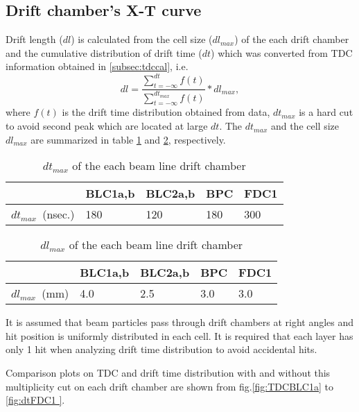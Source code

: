 \subsection{Drift chamber's X-T curve}
\label{subsec:xtcurve}
Drift length ($dl$) is calculated from the cell size ($dl_{max}$) of the each drift chamber and the cumulative distribution of drift time ($dt$) which was converted from TDC information obtained in \ref{subsec:tdccal}, i.e.
\begin{equation}
dl = \frac{\displaystyle \sum_{t=-\infty}^{dt} f(t) }{\displaystyle \sum_{t=-\infty}^{dt_{max}} f(t) }*dl_{max},
\end{equation}
where $f(t)$ is the drift time distribution obtained from data, $dt_{max}$ is a hard cut to avoid second peak which are located at large $dt$.
The $dt_{max}$ and the cell size $dl_{max}$ are summarized in table \ref{tab:dtmax} and \ref{tab:dlmax}, respectively.

\begin{table}[h]
\centering
\begin{tabular}{l|l|l|l|l}\hline
           & BLC1a,b & BLC2a,b & BPC & FDC1 \\\hline
$dt_{max}$\  (nsec.) & 180     & 120     & 180 & 300  \\\hline
\end{tabular}
\caption{\label{tab:dtmax} $dt_{max}$ of the each beam line drift chamber}
\end{table}

\begin{table}[h]
\centering
\begin{tabular}{l|l|l|l|l}\hline
                & BLC1a,b & BLC2a,b & BPC & FDC1 \\\hline
$dl_{max}$\ (mm)& 4.0     & 2.5     & 3.0 & 3.0  \\\hline
\end{tabular}
\caption{\label{tab:dlmax} $dl_{max}$ of the each beam line drift chamber}
\end{table}

It is assumed that beam particles pass through drift chambers at right angles and hit position is uniformly distributed in each cell.
It is required that each layer has only 1 hit when analyzing drift time distribution to avoid accidental hits. 

Comparison plots on TDC and drift time distribution with and without this multiplicity cut on each drift chamber are shown from fig.\ref{fig:TDCBLC1a} to \ref{fig:dtFDC1
}. 



